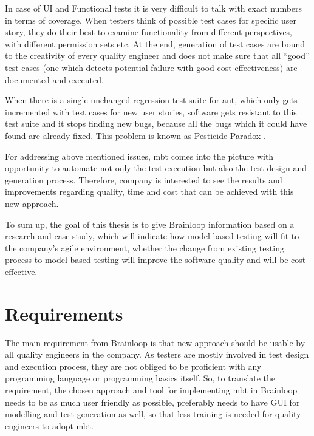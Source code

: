 \par
In case of UI and Functional tests it is very difficult to talk with exact numbers in terms of coverage. When testers think of possible test cases for specific user story, they do their best to examine functionality from different perspectives, with different permission sets etc. At the end, generation of test cases are bound to the creativity of every quality engineer and does not make sure that all “good” test cases (one which detects potential failure with good cost-effectiveness) are documented and executed.

\par
When there is a single unchanged regression test suite for \acrlong{aut}, which only gets incremented with test cases for new user stories, software gets resistant to this test suite and it stops finding new bugs, because all the bugs which it could have found are already fixed. This problem is known as Pesticide Paradox \cite{Pesticide_Paradox}.

\par
For addressing above mentioned issues, \acrshort{mbt} comes into the picture with opportunity to automate not only the test execution but also the test design and generation process. Therefore, company is interested to see the results and improvements regarding quality, time and cost that can be achieved with this new approach.

\par
To sum up, the goal of this thesis is to give Brainloop information based on a research and case study, which will indicate how model-based testing will fit to the company’s agile environment, whether the change from existing testing process to model-based testing will improve the software quality and will be cost-effective.

\section{Requirements}

\par
The main requirement from Brainloop is that new approach should be usable by all quality engineers in the company. As testers are mostly involved in test design and execution process, they are not obliged to be proficient with any programming language or programming basics itself. So, to translate the requirement, the chosen approach and tool for implementing \acrshort{mbt} in Brainloop needs to be as much user friendly as possible, preferably needs to have GUI for modelling and test generation as well, so that less training is needed for quality engineers to adopt \acrshort{mbt}.

